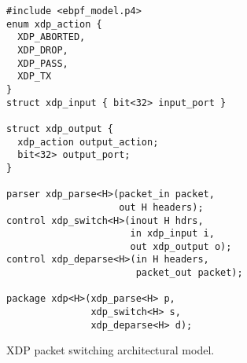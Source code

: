 \begin{figure}
\begin{lstlisting}
#include <ebpf_model.p4>
enum xdp_action {
  XDP_ABORTED,
  XDP_DROP,
  XDP_PASS,
  XDP_TX
}
struct xdp_input { bit<32> input_port }

struct xdp_output {
  xdp_action output_action;
  bit<32> output_port;
}

parser xdp_parse<H>(packet_in packet,
                    out H headers);
control xdp_switch<H>(inout H hdrs,
                      in xdp_input i,
                      out xdp_output o);
control xdp_deparse<H>(in H headers,
                       packet_out packet);

package xdp<H>(xdp_parse<H> p,
               xdp_switch<H> s,
               xdp_deparse<H> d);
\end{lstlisting}
\caption{XDP packet switching architectural
  model.}\label{fig:xdp-model}
\end{figure}

